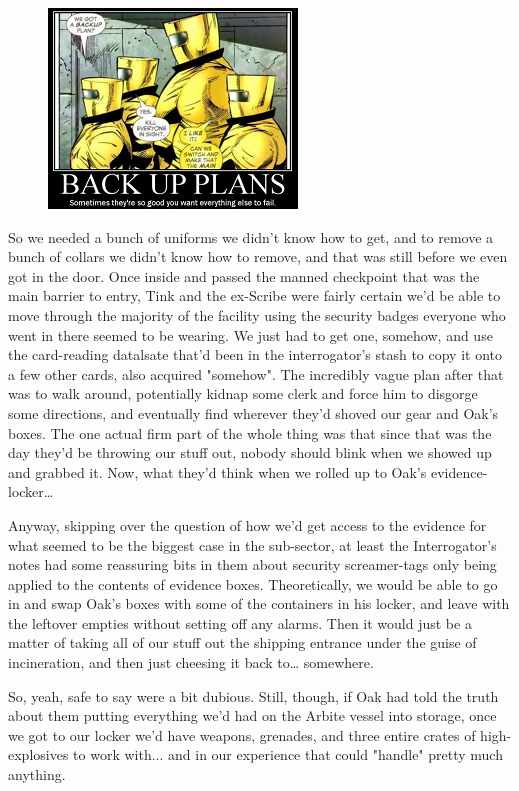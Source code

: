 \begin{figure}
	\begin{center}
		\includegraphics[width=\figwidth]{pics/21/33.png}
	\end{center}
\end{figure}
So we needed a bunch of uniforms we didn't know how to get, and to remove a bunch of collars we didn't know how to remove, and that was still before we even got in the door. 
Once inside and passed the manned checkpoint that was the main barrier to entry, Tink and the ex-Scribe were fairly certain we'd be able to move through the majority of the facility using the security badges everyone who went in there seemed to be wearing. 
We just had to get one, somehow, and use the card-reading datalsate that'd been in the interrogator's stash to copy it onto a few other cards, also acquired "somehow". 
The incredibly vague plan after that was to walk around, potentially kidnap some clerk and force him to disgorge some directions, and eventually find wherever they'd shoved our gear and Oak's boxes. 
The one actual firm part of the whole thing was that since that was the day they'd be throwing our stuff out, nobody should blink when we showed up and grabbed it. 
Now, what they'd think when we rolled up to Oak's evidence-locker…

Anyway, skipping over the question of how we'd get access to the evidence for what seemed to be the biggest case in the sub-sector, at least the Interrogator's notes had some reassuring bits in them about security screamer-tags only being applied to the contents of evidence boxes. 
Theoretically, we would be able to go in and swap Oak's boxes with some of the containers in his locker, and leave with the leftover empties without setting off any alarms. 
Then it would just be a matter of taking all of our stuff out the shipping entrance under the guise of incineration, and then just cheesing it back to… somewhere. 


So, yeah, safe to say were a bit dubious. 
Still, though, if Oak had told the truth about them putting everything we'd had on the Arbite vessel into storage, once we got to our locker we'd have weapons, grenades, and three entire crates of high-explosives to work with... 
and in our experience that could "handle" pretty much anything.

